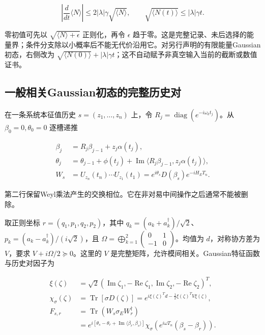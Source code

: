 \documentclass[
  11pt,
  oneside]{book}
\begin{document}
\[
\left|\frac{d}{dt}\langle N\rangle\right|
\le2|\lambda|\gamma\sqrt{\langle N\rangle},
\qquad
\sqrt{\langle N(t)\rangle}\le|\lambda|\gamma t.
\]

零初值可先以 \(\sqrt{\langle N\rangle+\epsilon}\) 正则化，再令
\(\epsilon\)
趋于零。这是完整记录、未后选择的能量界；条件分支除以小概率后不能无代价沿用它。对另行声明的有限能量Gaussian初态，右侧改为
\(\sqrt{\langle N(0)\rangle}+|\lambda|\gamma t\)；这不自动赋予非真空输入当前的截断或数值证书。

\subsection{一般相关Gaussian初态的完整历史对}

在一条系统本征值历史 \(s=(z_1,\ldots,z_n)\) 上，令
\(R_j=\operatorname{diag}(e^{-i\omega_kt_j})\)。从
\(\beta_0=0,\theta_0=0\) 逐槽递推

\[
\begin{aligned}
\beta_j&=R_j\beta_{j-1}+z_j\alpha(t_j),\\
\theta_j&=\theta_{j-1}+\phi(t_j)
+\operatorname{Im}\langle R_j\beta_{j-1},z_j\alpha(t_j)\rangle,\\
W_s&=U_{z_n}(t_n)\cdots U_{z_1}(t_1)
=e^{i\theta_s}D(\beta_s)e^{-iH_ET_n}.
\end{aligned}
\]

第二行保留Weyl乘法产生的交换相位。它在非对易中间操作之后通常不能被删除。

取正则坐标 \(r=(q_1,p_1,q_2,p_2)\)，其中
\(q_k=(a_k+a_k^\dagger)/\sqrt2\)、\(p_k=(a_k-a_k^\dagger)/(i\sqrt2)\)，且
\(\Omega=\bigoplus_{k=1}^2\begin{pmatrix}0&1\\-1&0\end{pmatrix}\)。均值为
\(d\)，对称协方差为 \(V\)，要求 \(V+i\Omega/2\succeq0\)。这里的 \(V\)
是完整矩阵，允许模间相关。Gaussian特征函数与历史对因子为

\[
\begin{aligned}
\xi(\zeta)&=\sqrt2(\operatorname{Im}\zeta_1,-\operatorname{Re}\zeta_1,
\operatorname{Im}\zeta_2,-\operatorname{Re}\zeta_2)^T,\\
\chi_\sigma(\zeta)&=\operatorname{Tr}[\sigma D(\zeta)]
=e^{i\xi(\zeta)^Td-\frac12\xi(\zeta)^TV\xi(\zeta)},\\
F_{s,r}&=\operatorname{Tr}(W_s\sigma_EW_r^\dagger)\\
&=e^{i[\theta_s-\theta_r+\operatorname{Im}\langle\beta_r,\beta_s\rangle]}
\chi_\sigma\!\left(e^{i\omega T_n}(\beta_s-\beta_r)\right).
\end{aligned}
\]
\end{document}
